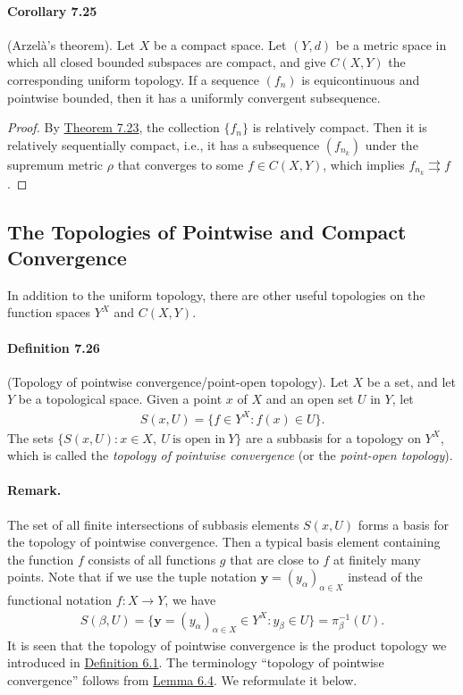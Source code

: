 \documentclass{article}
\numberwithin{equation}{section}
\theoremstyle{plain}
\theoremstyle{definition}
\begin{document}
\paragraph{Corollary 7.25\label{cor:7.25}} (Arzelà's theorem). Let $X$ be a compact space. Let $(Y,d)$ be a metric space in which all closed bounded subspaces are compact, and give $C(X,Y)$ the corresponding uniform topology. If a sequence $(f_n)$ is equicontinuous and pointwise bounded, then it has a uniformly convergent subsequence.
\begin{proof}
By \hyperref[thm:7.23]{Theorem 7.23}, the collection $\{f_n\}$ is relatively compact. Then it is relatively sequentially compact, i.e., it has a subsequence $(f_{n_k})$ under the supremum metric $\rho$ that converges to some $f\in C(X,Y)$, which implies $f_{n_k}\rightrightarrows f$.
\end{proof} 

\subsection{The Topologies of Pointwise and Compact Convergence}
In addition to the uniform topology, there are other useful topologies on the function spaces $Y^X$ and $C(X,Y)$.

\paragraph{Definition 7.26\label{def:7.26}} (Topology of pointwise convergence/point-open topology). Let $X$ be a set, and let $Y$ be a topological space. Given a point $x$ of $X$ and an open set $U$ in $Y$, let
\begin{align*}
S(x,U)=\{f\in Y^X: f(x)\in U\}.
\end{align*}
The sets $\{S(x,U):x\in X,\ U\ \text{is open in}\ Y\}$ are a subbasis for a topology on $Y^X$, which is called the \textit{topology of pointwise convergence} (or the \textit{point-open topology}).

\paragraph{Remark.} The set of all finite intersections of subbasis elements $S(x,U)$ forms a basis for the topology of pointwise convergence. Then a typical basis element containing the function $f$ consists of all functions $g$ that are close to $f$ at finitely many points. Note that if we use the tuple notation $\mathbf{y}=(y_\alpha)_{\alpha\in X}$ instead of the functional notation $f:X\to Y$, we have
\begin{align*}
	S(\beta,U)=\{\mathbf{y}=(y_\alpha)_{\alpha\in X}\in Y^X:y_\beta\in U\}=\pi_\beta^{-1}(U).
\end{align*}
It is seen that the topology of pointwise convergence is the product topology we introduced in \hyperref[def:6.1]{Definition 6.1}. The terminology ``topology of pointwise convergence'' follows from \hyperref[lemma:6.4]{Lemma 6.4}. We reformulate it below.
\end{document}
